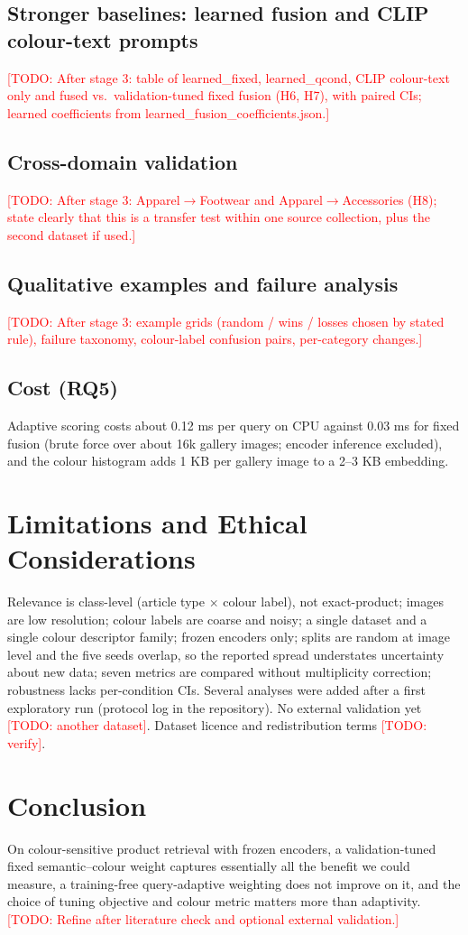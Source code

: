 \documentclass[11pt]{article}
\newcommand{\todo}[1]{\textcolor{red}{[TODO: #1]}}
\begin{document}
\subsection{Stronger baselines: learned fusion and CLIP colour-text prompts}\todo{After stage 3: table of learned\_fixed, learned\_qcond, CLIP colour-text only and fused vs.\ validation-tuned fixed fusion (H6, H7), with paired CIs; learned coefficients from learned\_fusion\_coefficients.json.}
\subsection{Cross-domain validation}\todo{After stage 3: Apparel$\to$Footwear and Apparel$\to$Accessories (H8); state clearly that this is a transfer test within one source collection, plus the second dataset if used.}
\subsection{Qualitative examples and failure analysis}\todo{After stage 3: example grids (random / wins / losses chosen by stated rule), failure taxonomy, colour-label confusion pairs, per-category changes.}
\subsection{Cost (RQ5)}

Adaptive scoring costs about 0.12 ms per query on CPU against 0.03 ms for fixed fusion (brute force over about 16k gallery images; encoder inference excluded), and the colour histogram adds 1 KB per gallery image to a 2--3 KB embedding.

\section{Limitations and Ethical Considerations}
Relevance is class-level (article type $\times$ colour label), not exact-product; images are low resolution; colour labels are coarse and noisy; a single dataset and a single colour descriptor family; frozen encoders only; splits are random at image level and the five seeds overlap, so the reported spread understates uncertainty about new data; seven metrics are compared without multiplicity correction; robustness lacks per-condition CIs. Several analyses were added after a first exploratory run (protocol log in the repository). No external validation yet \todo{another dataset}. Dataset licence and redistribution terms \todo{verify}.

\section{Conclusion}
On colour-sensitive product retrieval with frozen encoders, a validation-tuned fixed semantic--colour weight captures essentially all the benefit we could measure, a training-free query-adaptive weighting does not improve on it, and the choice of tuning objective and colour metric matters more than adaptivity. \todo{Refine after literature check and optional external validation.}

\end{document}
